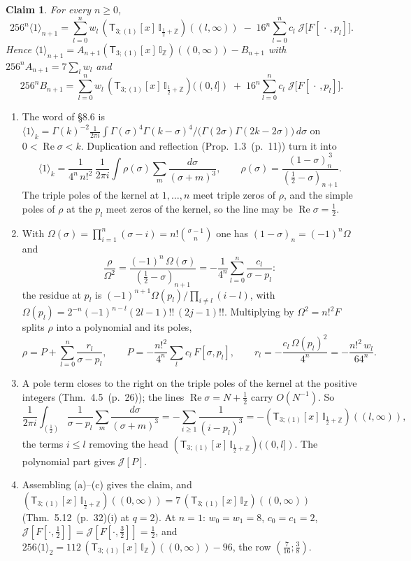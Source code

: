\documentclass[11pt]{article}
\newcommand{\sT}{\mathsf T}
\newcommand{\IZ}{\mathbb I_{\mathbb Z}}
\newcommand{\Ilat}[1]{\mathbb I_{#1}}
\newcommand{\Tx}[3]{(\sT_{#1;(1)}[x]\,#2)((#3,\infty))}
\newcommand{\Th}[4]{(\sT_{#1;(1)}[x]\,#2)((#3,#4])}
\DeclareMathOperator{\re}{Re}
\newcommand{\hb}[2]{#1~(p.~#2)}   %
\theoremstyle{plain}
\newtheorem{claim}{Claim}[section]
\theoremstyle{remark}
\begin{document}
\begin{claim}\label{cl:row4}
For every $n\ge0$,
\[
256^n\langle1\rangle_{n+1}=\sum_{l=0}^{n}w_l\,\Tx{3}{\Ilat{\frac12+\mathbb Z}}{l}\;-\;16^n\sum_{l=0}^{n}c_l\;\mathcal J\big[F[\,\cdot\,,p_l]\big].
\]
Hence $\langle1\rangle_{n+1}=A_{n+1}\Tx3\IZ0-B_{n+1}$ with $256^nA_{n+1}=7\sum_lw_l$ and
\[
256^nB_{n+1}=\sum_{l=0}^{n}w_l\,\Th{3}{\Ilat{\frac12+\mathbb Z}}{0}{l}\;+\;16^n\sum_{l=0}^{n}c_l\;\mathcal J\big[F[\,\cdot\,,p_l]\big].
\]
\end{claim}

\begin{enumerate}[label=(\alph*)]
\item The word of \S8.6 is $\langle1\rangle_k=\Gamma(k)^{-2}\frac1{2\pi i}\int\Gamma(\sigma)^4\Gamma(k-\sigma)^4\big/\big(\Gamma(2\sigma)\Gamma(2k-2\sigma)\big)\,d\sigma$ on $0<\re\sigma<k$. Duplication and reflection (Prop.~\hb{1.3}{11}) turn it into
\[
\langle1\rangle_k=\frac{1}{4^n\,n!^2}\,\frac1{2\pi i}\int\rho(\sigma)\sum_{m}\frac{d\sigma}{(\sigma+m)^3},\qquad\rho(\sigma)=\frac{(1-\sigma)_n^{\,3}}{(\frac12-\sigma)_{n+1}}.
\]
The triple poles of the kernel at $1,\dots,n$ meet triple zeros of $\rho$, and the simple poles of $\rho$ at the $p_l$ meet zeros of the kernel, so the line may be $\re\sigma=\frac12$.
\item With $\Omega(\sigma)=\prod_{i=1}^n(\sigma-i)=n!\binom{\sigma-1}{n}$ one has $(1-\sigma)_n=(-1)^n\Omega$ and
\[
\frac{\rho}{\Omega^2}=\frac{(-1)^n\,\Omega(\sigma)}{(\frac12-\sigma)_{n+1}}=-\frac1{4^n}\sum_{l=0}^{n}\frac{c_l}{\sigma-p_l}:
\]
the residue at $p_l$ is $(-1)^{n+1}\Omega(p_l)/\prod_{i\ne l}(i-l)$, with $\Omega(p_l)=2^{-n}(-1)^{n-l}(2l-1)!!\,(2j-1)!!$. Multiplying by $\Omega^2=n!^2F$ splits $\rho$ into a polynomial and its poles,
\[
\rho=P+\sum_{l=0}^n\frac{r_l}{\sigma-p_l},\qquad P=-\frac{n!^2}{4^n}\sum_{l}c_l\,F[\sigma,p_l],\qquad r_l=-\frac{c_l\,\Omega(p_l)^2}{4^n}=-\frac{n!^2\,w_l}{64^n}.
\]
\item A pole term closes to the right on the triple poles of the kernel at the positive integers (Thm.~\hb{4.5}{26}); the lines $\re\sigma=N+\frac12$ carry $O(N^{-1})$. So
\[
\frac1{2\pi i}\int_{(\frac12)}\frac1{\sigma-p_l}\sum_m\frac{d\sigma}{(\sigma+m)^3}=-\sum_{i\ge1}\frac1{(i-p_l)^3}=-\Tx{3}{\Ilat{\frac12+\mathbb Z}}{l},
\]
the terms $i\le l$ removing the head $\Th{3}{\Ilat{\frac12+\mathbb Z}}{0}{l}$. The polynomial part gives $\mathcal J[P]$.
\item Assembling (a)--(c) gives the claim, and $\Tx3{\Ilat{\frac12+\mathbb Z}}0=7\,\Tx3\IZ0$ (Thm.~\hb{5.12}{32}(i) at $q=2$). At $n=1$: $w_0=w_1=8$, $c_0=c_1=2$, $\mathcal J[F[\cdot,\frac12]]=\mathcal J[F[\cdot,\frac32]]=\frac12$, and $256\langle1\rangle_2=112\,\Tx3\IZ0-96$, the row $(\frac7{16};\frac38)$.
\end{enumerate}
\end{document}
